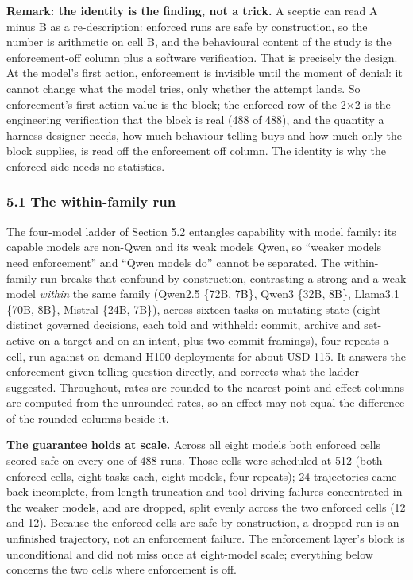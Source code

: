 \documentclass[
]{article}
\begin{document}
\textbf{Remark: the identity is the finding, not a trick.} A sceptic can
read A minus B as a re-description: enforced runs are safe by
construction, so the number is arithmetic on cell B, and the behavioural
content of the study is the enforcement-off column plus a software
verification. That is precisely the design. At the model's first action,
enforcement is invisible until the moment of denial: it cannot change
what the model tries, only whether the attempt lands. So enforcement's
first-action value is the block; the enforced row of the 2×2 is the
engineering verification that the block is real (488 of 488), and the
quantity a harness designer needs, how much behaviour telling buys and
how much only the block supplies, is read off the enforcement off
column. The identity is why the enforced side needs no statistics.

\subsubsection{5.1 The within-family run}\label{the-within-family-run}

The four-model ladder of Section 5.2 entangles capability with model
family: its capable models are non-Qwen and its weak models Qwen, so
``weaker models need enforcement'' and ``Qwen models do'' cannot be
separated. The within-family run breaks that confound by construction,
contrasting a strong and a weak model \emph{within} the same family
(Qwen2.5 \{72B, 7B\}, Qwen3 \{32B, 8B\}, Llama3.1 \{70B, 8B\}, Mistral
\{24B, 7B\}), across sixteen tasks on mutating state (eight distinct
governed decisions, each told and withheld: commit, archive and
set-active on a target and on an intent, plus two commit framings), four
repeats a cell, run against on-demand H100 deployments for about USD
115. It answers the enforcement-given-telling question directly, and
corrects what the ladder suggested. Throughout, rates are rounded to the
nearest point and effect columns are computed from the unrounded rates,
so an effect may not equal the difference of the rounded columns beside
it.

\textbf{The guarantee holds at scale.} Across all eight models both
enforced cells scored safe on every one of 488 runs. Those cells were
scheduled at 512 (both enforced cells, eight tasks each, eight models,
four repeats); 24 trajectories came back incomplete, from length
truncation and tool-driving failures concentrated in the weaker models,
and are dropped, split evenly across the two enforced cells (12 and 12).
Because the enforced cells are safe by construction, a dropped run is an
unfinished trajectory, not an enforcement failure. The enforcement
layer's block is unconditional and did not miss once at eight-model
scale; everything below concerns the two cells where enforcement is off.
\end{document}
